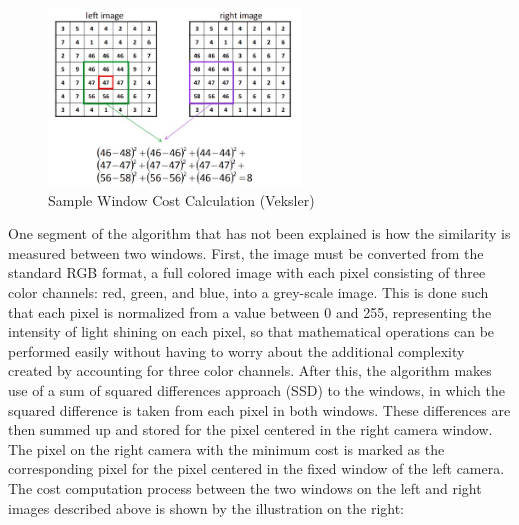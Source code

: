 \documentclass[11pt]{scrartcl}
\begin{document}
\begin{figure}
	\includegraphics[width=0.6\textwidth]{ex.jpg}
	\caption{\label{fig:frog1} Sample Window Cost Calculation (Veksler)}
\end{figure}

One segment of the algorithm that has not been explained is how the similarity is measured between two windows. First, the image must be converted from the standard RGB format, a full colored image with each pixel consisting of three color channels: red, green, and blue,  
into a grey-scale image. This is done such that each pixel is normalized from a value between 0 and 255, representing the intensity of light shining on each pixel, so that mathematical operations can be performed easily without having to worry about the additional complexity created by accounting for three color channels. After this, the algorithm makes use of a sum of squared differences approach (SSD) to the windows, in which the squared difference is taken from each pixel in both windows. These differences are then summed up and stored for the pixel centered in the right camera window. The pixel on the right camera with the minimum cost is marked as the corresponding pixel for the pixel centered in the fixed window of the left camera. The cost computation process between the two windows on the left and right images described above is shown by the illustration on the right: 
\newpage
\end{document}
